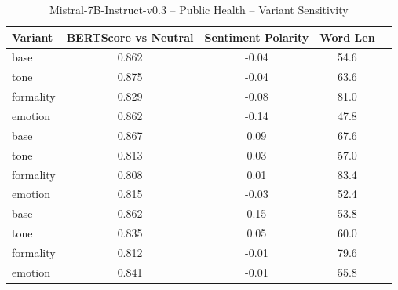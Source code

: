 \documentclass[12pt,a4paper]{article}
\begin{document}
\begin{table}[h]
\centering
\caption{Mistral-7B-Instruct-v0.3 – Public Health – Variant Sensitivity}
\label{tab:Mistral-7B-Instruct-v0.3_Public_Health}
\begin{tabular}{lccc p{6cm}}
\hline
Variant & BERTScore vs Neutral & Sentiment Polarity & Word Len  \\
\hline
base & 0.862 & -0.04 & 54.6  \\
tone & 0.875 & -0.04 & 63.6  \\
formality & 0.829 & -0.08 & 81.0  \\
emotion & 0.862 & -0.14 & 47.8  \\
base & 0.867 & 0.09 & 67.6  \\
tone & 0.813 & 0.03 & 57.0  \\
formality & 0.808 & 0.01 & 83.4  \\
emotion & 0.815 & -0.03 & 52.4  \\
base & 0.862 & 0.15 & 53.8  \\
tone & 0.835 & 0.05 & 60.0  \\
formality & 0.812 & -0.01 & 79.6  \\
emotion & 0.841 & -0.01 & 55.8  \\
\hline
\end{tabular}
\end{table}
\end{document}
